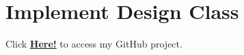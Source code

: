 \section{Implement Design Class}


Click \href{https://github.com/Josmanid/PizzaStore}{\textbf{Here!}} to access my GitHub project.
